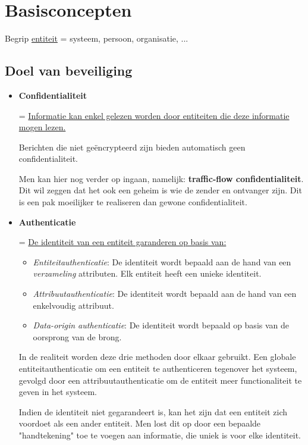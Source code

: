 \documentclass{report}
\begin{document}
	\tableofcontents
	\chapter{Basisconcepten}
	Begrip \underline{entiteit} = systeem, persoon, organisatie, ...
	\section{Doel van beveiliging}
	\begin{itemize}
		\item \textbf{Confidentialiteit}
		
		= \underline{Informatie kan enkel gelezen worden door entiteiten die deze informatie mogen lezen.}

		Berichten die niet geëncrypteerd zijn bieden automatisch geen confidentialiteit.
	
		Men kan hier nog verder op ingaan, namelijk: \textbf{traffic-flow confidentialiteit}. Dit wil zeggen dat het ook een geheim is wie de zender en ontvanger zijn. Dit is een pak moeilijker te realiseren dan gewone confidentialiteit.

		\item \textbf{Authenticatie}
		
		= \underline{De identiteit van een entiteit garanderen op basis van:}
			\begin{itemize}
				\item \emph{Entiteitauthenticatie}: De identiteit wordt bepaald aan de hand van een \emph{verzameling} attributen. Elk entiteit heeft een unieke identiteit.
				\item \emph{Attribuutauthenticatie}: De identiteit wordt bepaald aan de hand van een enkelvoudig attribuut.
				\item \emph{Data-origin authenticatie}: De identiteit wordt bepaald op basis van de oorsprong van de brong.
			\end{itemize}
			In de realiteit worden deze drie methoden door elkaar gebruikt. Een globale entiteitauthenticatie om een entiteit te authenticeren tegenover het systeem, gevolgd door een attribuutauthenticatie om de entiteit meer functionaliteit te geven in het systeem.

		Indien de identiteit niet gegarandeert is, kan het zijn dat een entiteit zich voordoet als een ander entiteit. Men lost dit op door een bepaalde "handtekening" toe te voegen aan informatie, die uniek is voor elke identiteit.


\end{itemize}
\end{document}
